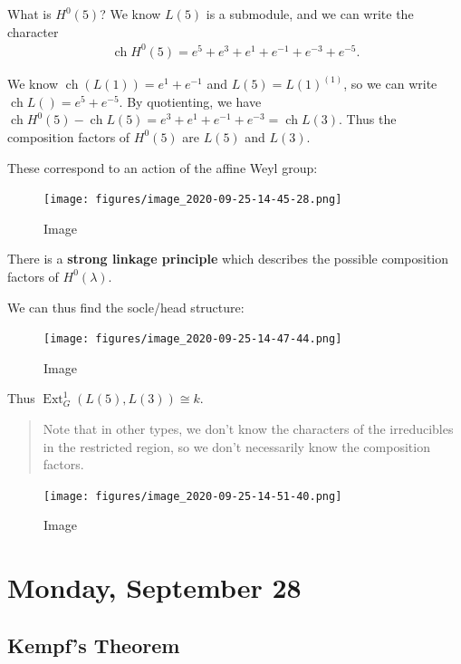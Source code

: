 \begin{example}
What is \(H^0(5)\)? We know \(L(5)\) is a submodule, and we can write
the character
\begin{align*}  
\operatorname{ch}H^0(5) = e^5 + e^3 + e^1 + e^{-1} + e^{-3} + e^{-5}
.\end{align*}

We know \(\operatorname{ch}(L(1)) = e^1 + e^{-1}\) and
\(L(5) = L(1)^{(1)}\), so we can write
\(\operatorname{ch}L() = e^{5} + e^{-5}\). By quotienting, we have
\(\operatorname{ch}H^0(5) - \operatorname{ch}L(5) = e^3 + e^1 + e^{-1} +e^{-3} = \operatorname{ch}L(3)\).
Thus the composition factors of \(H^0(5)\) are \(L(5)\) and \(L(3)\).

These correspond to an action of the affine Weyl group:

\begin{figure}
\centering
\texttt{[image: figures/image\_2020-09-25-14-45-28.png]}
\caption{Image}
\end{figure}

There is a \textbf{strong linkage principle} which describes the
possible composition factors of \(H^0(\lambda)\).

We can thus find the socle/head structure:

\begin{figure}
\centering
\texttt{[image: figures/image\_2020-09-25-14-47-44.png]}
\caption{Image}
\end{figure}

Thus \(\operatorname{Ext}_G^1(L(5), L(3)) \cong k\).

\end{example}

\begin{quote}
Note that in other types, we don't know the characters of the
irreducibles in the restricted region, so we don't necessarily know the
composition factors.
\end{quote}

\begin{figure}
\centering
\texttt{[image: figures/image\_2020-09-25-14-51-40.png]}
\caption{Image}
\end{figure}

\hypertarget{monday-september-28}{%
\section{Monday, September 28}\label{monday-september-28}}

\hypertarget{kempfs-theorem}{%
\subsection{Kempf's Theorem}\label{kempfs-theorem}}

